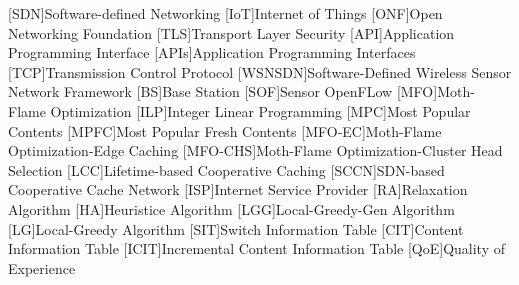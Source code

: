 \documentclass[conference]{IEEEtran}
\begin{document}
\printbibliography
\begin{acronym}
	[SDN]{Software-defined Networking}
	[IoT]{Internet of Things}
	[ONF]{Open Networking Foundation}
	[TLS]{Transport Layer Security}
	[API]{Application Programming Interface}
	[APIs]{Application Programming Interfaces}
	[TCP]{Transmission Control Protocol}
	[WSNSDN]{Software-Defined Wireless Sensor Network Framework}
	[BS]{Base Station}
	[SOF]{Sensor OpenFLow}
	[MFO]{Moth-Flame Optimization}
	[ILP]{Integer Linear Programming}
	[MPC]{Most Popular Contents}
	[MPFC]{Most Popular Fresh Contents}
	[MFO-EC]{Moth-Flame Optimization-Edge Caching}
	[MFO-CHS]{Moth-Flame Optimization-Cluster Head Selection}
	[LCC]{Lifetime-based Cooperative Caching}
	[SCCN]{SDN-based Cooperative Cache Network}
	[ISP]{Internet Service Provider}
	[RA]{Relaxation Algorithm}
	[HA]{Heuristice Algorithm}
	[LGG]{Local-Greedy-Gen Algorithm}
	[LG]{Local-Greedy Algorithm}
	[SIT]{Switch Information Table}
	[CIT]{Content Information Table}
	[ICIT]{Incremental Content Information Table}
	[QoE]{Quality of Experience}
\end{acronym}

\end{document}
